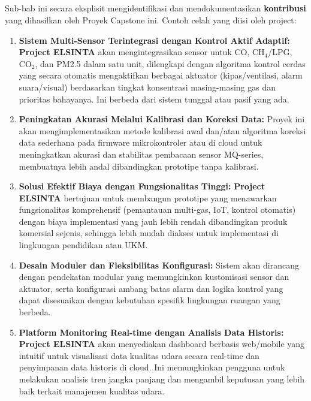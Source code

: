 \documentclass{elsinta}
\begin{document}
\subsection{\ProjectContribsTitle}
Sub-bab ini secara eksplisit mengidentifikasi dan mendokumentasikan \textbf{kontribusi} yang dihasilkan oleh Proyek Capstone ini. Contoh celah yang diisi oleh project:
\begin{enumerate}
    \item \textbf{Sistem Multi-Sensor Terintegrasi dengan Kontrol Aktif Adaptif:} \textbf{Project ELSINTA} akan mengintegrasikan sensor untuk CO, CH$_4$/LPG, CO$_2$, dan PM2.5 dalam satu unit, dilengkapi dengan algoritma kontrol cerdas yang secara otomatis mengaktifkan berbagai aktuator (kipas/ventilasi, alarm suara/visual) berdasarkan tingkat konsentrasi masing-masing gas dan prioritas bahayanya. Ini berbeda dari sistem tunggal atau pasif yang ada.
    \item \textbf{Peningkatan Akurasi Melalui Kalibrasi dan Koreksi Data:} Proyek ini akan mengimplementasikan metode kalibrasi awal dan/atau algoritma koreksi data sederhana pada firmware mikrokontroler atau di cloud untuk meningkatkan akurasi dan stabilitas pembacaan sensor MQ-series, membuatnya lebih andal dibandingkan prototipe tanpa kalibrasi.
    \item \textbf{Solusi Efektif Biaya dengan Fungsionalitas Tinggi:} \textbf{Project ELSINTA} bertujuan untuk membangun prototipe yang menawarkan fungsionalitas komprehensif (pemantauan multi-gas, IoT, kontrol otomatis) dengan biaya implementasi yang jauh lebih rendah dibandingkan produk komersial sejenis, sehingga lebih mudah diakses untuk implementasi di lingkungan pendidikan atau UKM.
    \item \textbf{Desain Moduler dan Fleksibilitas Konfigurasi:} Sistem akan dirancang dengan pendekatan modular yang memungkinkan kustomisasi sensor dan aktuator, serta konfigurasi ambang batas alarm dan logika kontrol yang dapat disesuaikan dengan kebutuhan spesifik lingkungan ruangan yang berbeda.
    \item \textbf{Platform Monitoring Real-time dengan Analisis Data Historis:} \textbf{Project ELSINTA} akan menyediakan dashboard berbasis web/mobile yang intuitif untuk visualisasi data kualitas udara secara real-time dan penyimpanan data historis di cloud. Ini memungkinkan pengguna untuk melakukan analisis tren jangka panjang dan mengambil keputusan yang lebih baik terkait manajemen kualitas udara.
\end{enumerate}
\end{document}
